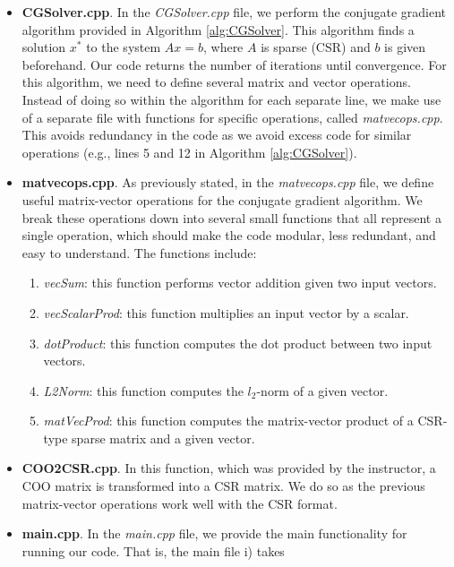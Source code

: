\documentclass[12pt, a4paper]{article}
\begin{document}
\begin{itemize}
    \item \textbf{CGSolver.cpp}. In the \textit{CGSolver.cpp} file, we perform 
    the  conjugate gradient algorithm provided in Algorithm \ref{alg:CGSolver}. 
    This algorithm finds a solution $x^*$ to the system $Ax = b$, where $A$ is 
    sparse (CSR) and $b$ is given beforehand. Our code returns the number 
    of iterations until convergence. For this algorithm, we need to define
    several matrix and vector operations. Instead of doing so within the
    algorithm for each separate line, we make use of a separate file
    with functions for specific operations, called \textit{matvecops.cpp}.
    This avoids redundancy in the code as we avoid excess code for similar
    operations (e.g., lines 5 and 12 in Algorithm \ref{alg:CGSolver}).
    \item \textbf{matvecops.cpp}. As previously stated, in the 
    \textit{matvecops.cpp} file, we define useful
    matrix-vector operations for the conjugate gradient algorithm. 
    We break these operations down into several small functions that all 
    represent a single operation, which should make the code modular,
    less redundant, and easy to understand. The functions include:
        \begin{enumerate}
            \item \textit{vecSum}: this function performs vector addition 
            given two input vectors.
            \item \textit{vecScalarProd}: this function multiplies an input
            vector by a scalar.
            \item \textit{dotProduct}: this function computes the dot product
            between two input vectors.
            \item \textit{L2Norm}: this function computes the $l_2$-norm of
            a given vector.
            \item \textit{matVecProd}: this function computes the matrix-vector
            product of a CSR-type sparse matrix and a given vector.
        \end{enumerate}
    \item \textbf{COO2CSR.cpp}. In this function, which was provided by the 
    instructor, a COO matrix is transformed into a CSR matrix. We do so as
    the previous matrix-vector operations work well with the CSR format.
    \item \textbf{main.cpp}. In the \textit{main.cpp} file, we provide the 
    main functionality for running our code. That is, the main file i) takes 

\end{itemize}
\end{document}
